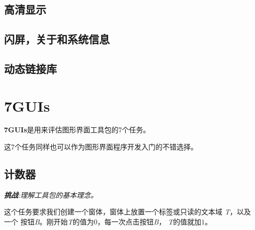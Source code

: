 \documentclass{ctexart}
\begin{document}
\subsection{高清显示}

\subsection{闪屏，关于和系统信息}

\subsection{动态链接库}

\section{7GUIs}

\textbf{7GUIs}是用来评估图形界面工具包的7个任务。

这7个任务同样也可以作为图形界面程序开发入门的不错选择。

\subsection{计数器}

\emph{\textbf{挑战}:理解工具包的基本理念。}

这个任务要求我们创建一个窗体，窗体上放置一个标签或只读的文本域
\emph{T}，以及一个
按钮\emph{B}。刚开始\emph{T}的值为$0$，每一次点击按钮\emph{B}，
\emph{T}的值就加$1$。
\end{document}
